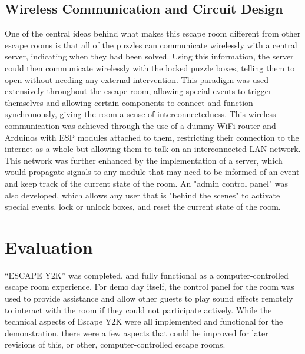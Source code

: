 \documentclass[conference]{IEEEtran}
\begin{document}
\subsection{Wireless Communication and Circuit Design} %
One of the central ideas behind what makes this escape room different from other escape rooms is that all of the puzzles can communicate
wirelessly with a central server, indicating when they had been solved. Using this information, the server could then communicate wirelessly with
the locked puzzle boxes, telling them to open without needing any external intervention. This paradigm was used extensively throughout the escape
room, allowing special events to trigger themselves and allowing certain components to connect and function synchronously, giving the room a 
sense of interconnectedness. This wireless communication was achieved through the use of a dummy WiFi router and Arduinos with ESP modules
attached to them, restricting their connection to the internet as a whole but allowing them to talk on an interconnected LAN network.
\\
\indent This network was further enhanced by the implementation of a server, which would propagate signals to any module that may need to be informed
of an event and keep track of the current state of the room. An "admin control panel" was also developed, which allows any user that is "behind the
scenes" to activate special events, lock or unlock boxes, and reset the current state of the room.


\section{Evaluation} %
``ESCAPE Y2K'' was completed, and fully functional as a computer-controlled escape room experience. For demo day itself, 
the control panel for the room was used to provide assistance and allow other guests to play sound effects remotely to 
interact with the room if they could not participate actively. While the technical aspects of Escape Y2K were all 
implemented and functional for the demonstration, there were a few aspects that could be improved for later revisions 
of this, or other, computer-controlled escape rooms.
\end{document}
